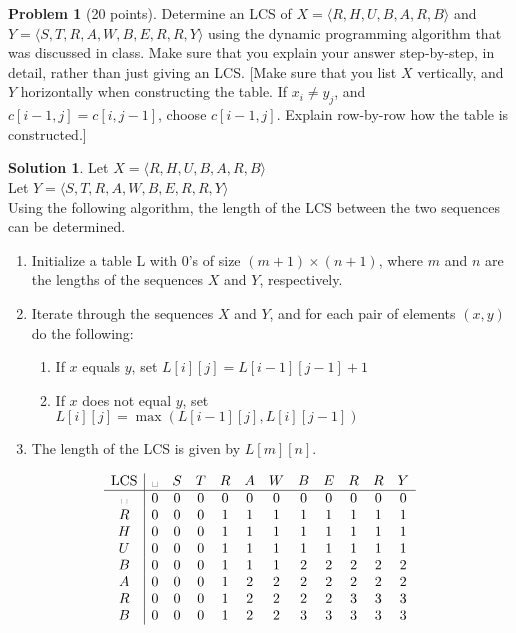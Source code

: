 \documentclass{article}
\theoremstyle{definition}
\newtheorem{problem}{Problem}
\newtheorem*{solution}{Solution}
\begin{document}
\begin{problem}[20 points]
  Determine an LCS of $X = \langle R,H,U,B,A,R,B\rangle$ and
  $Y = \langle S,T,R,A,W,B,E,R,R,Y \rangle$ using the dynamic programming
  algorithm that was discussed in class.  Make sure that you explain your
  answer step-by-step, in detail, rather than just giving an LCS.
  [Make sure that you list $X$ vertically, and $Y$ horizontally when
  constructing the table. If $x_i\neq y_j$, and $c[i-1,j] = c[i,j-1]$,
  choose $c[i-1,j]$. Explain row-by-row how the table is constructed.] 
\end{problem}
\begin{solution}
Let $X=\langle R,H,U,B,A,R,B \rangle$\\
Let $Y=\langle S,T,R,A,W,B,E,R,R,Y \rangle$\\
Using the following algorithm, the length of the LCS between the two sequences can be determined.
\begin{enumerate}
    \item Initialize a table L with 0's of size $(m+1)\times(n+1)$, where $m$ and $n$ are the lengths of the sequences $X$ and $Y$, respectively.
    \item Iterate through the sequences $X$ and $Y$, and for each pair of elements $(x,y)$ do the following:
    \begin{enumerate}
        \item If $x$ equals $y$, set $L[i][j]=L[i-1][j-1]+1$
        \item If $x$ does not equal $y$, set $L[i][j]=\max(L[i-1][j], L[i][j-1])$
    \end{enumerate}
    \item The length of the LCS is given by $L[m][n]$.
\end{enumerate}
\[
\begin{array}{c|ccccccccccc}
\text{LCS} & \text{\textvisiblespace} & S & T & R & A & W & B & E & R & R & Y \\
\hline
\text{\textvisiblespace} & 0 & 0 & 0 & 0 & 0 & 0 & 0 & 0 & 0 & 0 & 0 \\
R & 0 & 0 & 0 & 1 & 1 & 1 & 1 & 1 & 1 & 1 & 1\\
H & 0 & 0 & 0 & 1 & 1 & 1 & 1 & 1 & 1 & 1 & 1\\
U & 0 & 0 & 0 & 1 & 1 & 1 & 1 & 1 & 1 & 1 & 1\\
B & 0 & 0 & 0 & 1 & 1 & 1 & 2 & 2 & 2 & 2 & 2\\
A & 0 & 0 & 0 & 1 & 2 & 2 & 2 & 2 & 2 & 2 & 2\\
R & 0 & 0 & 0 & 1 & 2 & 2 & 2 & 2 & 3 & 3 & 3\\
B & 0 & 0 & 0 & 1 & 2 & 2 & 3 & 3 & 3 & 3 & 3\\
\end{array}
\]


\end{solution}
\end{document}
